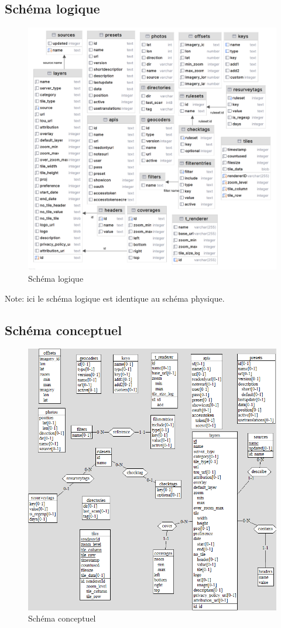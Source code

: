 \subsection{Schéma logique}
\begin{figure}[H]
    \centering
    \includegraphics[scale=1]{images/schema_logique.png}
    \caption{Schéma logique}
    \label{fig:schéma_logique}
\end{figure}
Note: ici le schéma logique est identique au schéma physique.

\newpage
\subsection{Schéma conceptuel}
\begin{figure}[H]
    \centering
    \includegraphics[scale=0.8]{images/schema_conceptuel.png}
    \caption{Schéma conceptuel}
    \label{fig:schéma_conceptuel}
\end{figure}